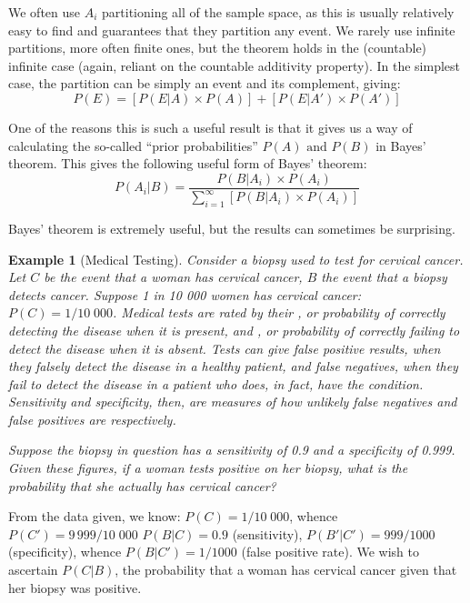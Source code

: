 \documentclass[12pt,a4paper]{article}
\newtheorem{ex}[thm]{Example}
\newcommand{\uline}[1]{\underline{\smash{#1}}}
\begin{document}
We often use $A_i$ partitioning all of the sample space, as this is usually relatively easy to find and guarantees that they partition any event. We rarely use infinite partitions, more often finite ones, but the theorem holds in the (countable) infinite case (again, reliant on the countable additivity property). In the simplest case, the partition can be simply an event and its complement, giving:
$$P(E) =[ P(E|A) \times P(A)] + [P(E|A') \times P(A')]$$

One of the reasons this is such a useful result is that it gives us a way of calculating the so-called ``prior probabilities'' $P(A) \text{ and } P(B)$ in Bayes' theorem. This gives the following useful form of Bayes' theorem:
$$P(A_i|B) = \frac{P(B|A_i) \times P(A_i)}{\sum\limits_{i=1}^{\infty}[P(B|A_i) \times P(A_i)]}$$\par
\vspace{12pt}

\noindent Bayes' theorem is extremely useful, but the results can sometimes be surprising.

\begin{ex}[Medical Testing]

Consider a biopsy used to test for cervical cancer. Let $C$ be the event that a woman has cervical cancer, $B$ the event that a biopsy detects cancer. Suppose 1 in 10 000 women has cervical cancer: $P(C) = 1/10\;000$. Medical tests are rated by their \uline{sensitivity}, or probability of correctly detecting the disease when it is present, and \uline{specificity}, or probability of correctly failing to detect the disease when it is absent. Tests can give false positive results, when they falsely detect the disease in a healthy patient, and false negatives, when they fail to detect the disease in a patient who does, in fact, have the condition. Sensitivity and specificity, then, are measures of how unlikely false negatives and false positives are respectively.

\indent Suppose the biopsy in question has a sensitivity of 0.9 and a specificity of 0.999. Given these figures, if a woman tests positive on her biopsy, what is the probability that she actually has cervical cancer?
\end{ex}

From the data given, we know: $P(C) = 1/10\;000$, whence $P(C') = 9\,999/10\;000$ $P(B|C) = 0.9$ (sensitivity),  $P(B'|C') = 999/1000$ (specificity), whence $P(B|C') = 1/1000$ (false positive rate). We wish to ascertain $P(C|B)$, the probability that a woman has cervical cancer given that her biopsy was positive.\par
\vspace{12pt}
\end{document}

